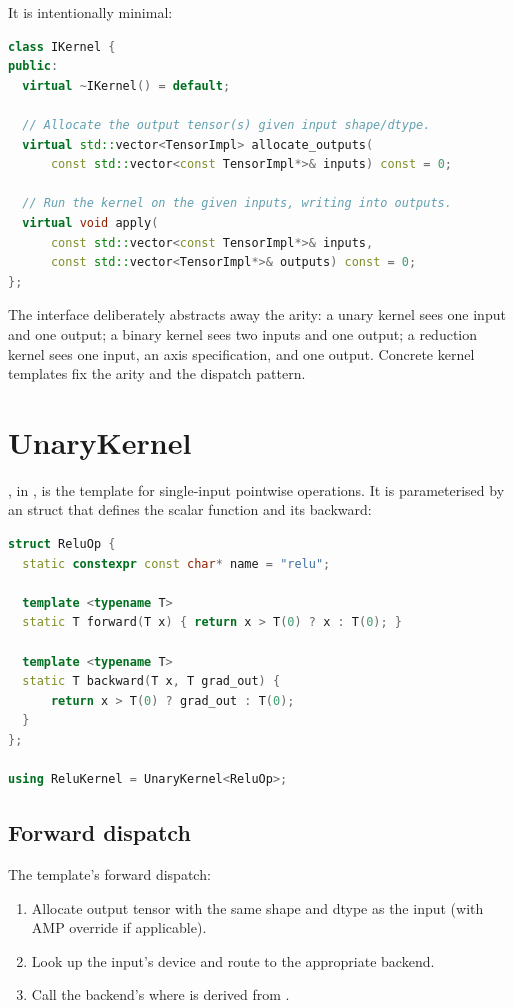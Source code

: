 It is intentionally minimal:

\begin{lstlisting}[style=lucidcpp,language=C++]
class IKernel {
public:
  virtual ~IKernel() = default;

  // Allocate the output tensor(s) given input shape/dtype.
  virtual std::vector<TensorImpl> allocate_outputs(
      const std::vector<const TensorImpl*>& inputs) const = 0;

  // Run the kernel on the given inputs, writing into outputs.
  virtual void apply(
      const std::vector<const TensorImpl*>& inputs,
      const std::vector<TensorImpl*>& outputs) const = 0;
};
\end{lstlisting}

The interface deliberately abstracts away the arity: a unary
kernel sees one input and one output; a binary kernel sees two
inputs and one output; a reduction kernel sees one input, an axis
specification, and one output. Concrete kernel templates fix the
arity and the dispatch pattern.

\section{UnaryKernel}
\label{sec:kernel_abstraction:unary}

, in ,
is the template for single-input pointwise operations. It is
parameterised by an  struct that defines the scalar
function and its backward:

\begin{lstlisting}[style=lucidcpp,language=C++]
struct ReluOp {
  static constexpr const char* name = "relu";

  template <typename T>
  static T forward(T x) { return x > T(0) ? x : T(0); }

  template <typename T>
  static T backward(T x, T grad_out) {
      return x > T(0) ? grad_out : T(0);
  }
};

using ReluKernel = UnaryKernel<ReluOp>;
\end{lstlisting}

\subsection{Forward dispatch}
\label{ssec:kernel_abstraction:unary_forward}

The template's forward dispatch:

\begin{enumerate}
  \item Allocate output tensor with the same shape and dtype as
    the input (with AMP override if applicable).
  \item Look up the input's device and route to the appropriate
    backend.
  \item Call the backend's  where
     is derived from .
\end{enumerate}

